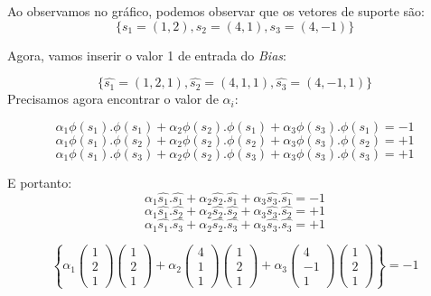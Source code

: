 \documentclass[
  openany]{book}
\begin{document}
Ao observamos no gráfico, podemos observar que os vetores de suporte são:
\[\{s_1=(1,2),s_2=(4,1),s_3=(4,-1)\}\]

Agora, vamos inserir o valor 1 de entrada do \emph{Bias}:

\[\{\hat{s_1}=(1,2,1),\hat{s_2}=(4,1,1),\hat{s_3}=(4,-1,1)\}\]
Precisamos agora encontrar o valor de \(\alpha_i\):

\[\alpha_1 \phi(s_1).\phi(s_1)+\alpha_2 \phi(s_2).\phi(s_1)+\alpha_3 \phi (s_3).\phi (s_1)=-1\]
\[\alpha_1 \phi(s_1).\phi(s_2)+\alpha_2 \phi(s_2).\phi(s_2)+\alpha_3 \phi (s_3).\phi (s_2)=+1\]
\[\alpha_1 \phi(s_1).\phi(s_3)+\alpha_2 \phi(s_2).\phi(s_3)+\alpha_3 \phi (s_3).\phi (s_3)=+1\]

E portanto:
\[\alpha_1 \hat{s_1}.\hat{s_1}+\alpha_2 \hat{s_2}.\hat{s_1}+\alpha_3 \hat{s_3}.\hat{s_1}=-1\]
\[\alpha_1 \hat{s_1}.\hat{s_2}+\alpha_2 \hat{s_2}.\hat{s_2}+\alpha_3 \hat{s_3}.\hat{s_2}=+1\]
\[\alpha_1 \hat{s_1}.\hat{s_3}+\alpha_2 \hat{s_2}.\hat{s_3}+\alpha_3 \hat{s_3}.\hat{s_3}=+1\]

\[\left\{
\alpha_1
\begin{pmatrix}
1\\2\\1
\end{pmatrix}
\begin{pmatrix}
1\\2\\1
\end{pmatrix} +
\alpha_2
\begin{pmatrix}
4\\1\\1
\end{pmatrix}
\begin{pmatrix}
1\\2\\1
\end{pmatrix}+
\alpha_3
\begin{pmatrix}
4\\-1\\1
\end{pmatrix}
\begin{pmatrix}
1\\2\\1
\end{pmatrix}
\right\}=-1\]
\end{document}
